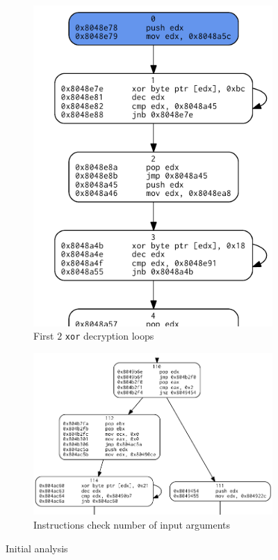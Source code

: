 \documentclass{easychair}
\begin{document}
\begin{figure}[ht]
  \centering
  \begin{subfigure}[b]{0.5\textwidth}
    \centering
    \includegraphics[width=1.0\textwidth,keepaspectratio]{first_blocks.png}
    \caption{First $2$ \texttt{xor} decryption loops}
    \label{fig:first2blocks}
  \end{subfigure}%
  \begin{subfigure}[b]{0.5\textwidth}
    \centering
    \includegraphics[width=1.0\textwidth,keepaspectratio]{check_param.png}
    \caption{Instructions check number of input arguments}
    \label{fig:checkparams}
  \end{subfigure}
  \caption{Initial analysis}
\end{figure}
\end{document}
